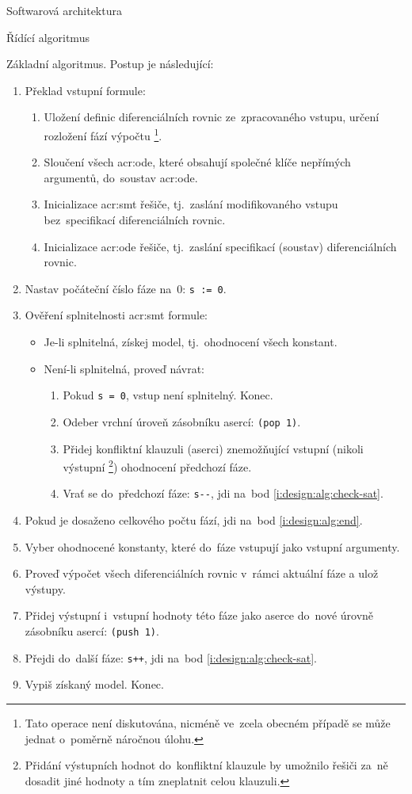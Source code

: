 \documentclass[thesis=M,czech]{FITthesis}[2012/06/26]
\newcommand{\acrlabel}[1]{acr:#1}
\newcommand{\acr}[1]{\acrshort{\acrlabel{#1}}}
\newcommand{\id}[1]{\texttt{#1}}
\newcommand{\rf}[1]{\ref{#1}}
\begin{document}
\begin{section}{Softwarová architektura}
\begin{subsection}{Řídící algoritmus}
\begin{paragraph}{Základní algoritmus.}
Postup je následující:
\begin{enumerate}
\item Překlad vstupní formule:
   \begin{enumerate}
   \item Uložení definic diferenciálních rovnic
      ze~zpracovaného vstupu, určení rozložení fází výpočtu%
      \footnote{Tato operace není diskutována,
      nicméně ve~zcela obecném případě se může jednat
      o~poměrně náročnou úlohu.}.
   \item Sloučení všech \acr{ode}, které obsahují
      společné klíče nepřímých argumentů,
      do~soustav \acr{ode}.
   \item Inicializace \acr{smt} řešiče,
      tj.~zaslání modifikovaného vstupu
      bez~specifikací diferenciálních rovnic.
   \item Inicializace \acr{ode} řešiče,
      tj.~zaslání specifikací (soustav) diferenciálních rovnic.
   \end{enumerate}
\item Nastav počáteční číslo fáze na~$0$: \id{s~:= 0}.
\item \label{i:design:alg:check-sat}
   Ověření splnitelnosti \acr{smt} formule:
   \begin{itemize}
   \item Je-li splnitelná, získej model,
      tj.~ohodnocení všech konstant.
   \item Není-li splnitelná, proveď návrat:
      \begin{enumerate}
      \item Pokud \id{s~= 0}, vstup není splnitelný. Konec.
      \item Odeber vrchní úroveň zásobníku asercí: \id{(pop~1)}.
      \item Přidej konfliktní klauzuli (aserci)
         znemožňující vstupní (nikoli výstupní%
         \footnote{Přidání výstupních hodnot do~konfliktní
         klauzule by umožnilo řešiči za~ně dosadit jiné hodnoty
         a tím zneplatnit celou klauzuli.})
         ohodnocení předchozí fáze.
      \item Vrať se do~předchozí fáze:
         \id{s-{}-}, jdi na~bod \rf{i:design:alg:check-sat}.
      \end{enumerate}
   \end{itemize}
\item Pokud je dosaženo celkového počtu fází,
   jdi na~bod \rf{i:design:alg:end}.
\item Vyber ohodnocené konstanty,
   které do~fáze vstupují jako vstupní argumenty.
\item Proveď výpočet všech diferenciálních rovnic
   v~rámci aktuální fáze a ulož výstupy.
\item Přidej výstupní i~vstupní hodnoty této fáze
   jako aserce do~nové úrovně zásobníku asercí: \id{(push~1)}.
\item Přejdi do~další fáze: \id{s+{}+},
   jdi na~bod \rf{i:design:alg:check-sat}.
\item \label{i:design:alg:end}
   Vypiš získaný model. Konec.
\end{enumerate}


\end{paragraph}
\end{subsection}
\end{section}
\end{document}

